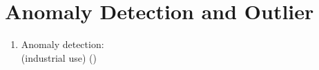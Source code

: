 \documentclass[12pt]{article}
\begin{document}
\section{Anomaly Detection and Outlier}

\begin{enumerate}
    \item Anomaly detection: \\
        \cite{emmottMetaAnalysisAnomalyDetection2015}
        (industrial use)
        ()
\end{enumerate}

\newpage


\end{document}
